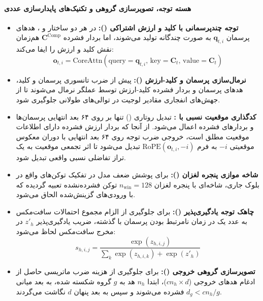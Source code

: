 \paragraph*{هسته توجه، تصویرسازی گروهی و تکنیک‌های پایدارسازی عددی}
\begin{itemize}
    \item \textbf{توجه چندپرسمانی با کلید و ارزش اشتراکی ():} در هر دو ساختار  و ، هدهای پرسمان $\mathbf{q}_{t,i}$ به صورت چندگانه تولید می‌شوند، اما بردار فشرده $\mathbf{C}^{\text{Comp}}$ هم‌زمان نقش کلید و ارزش را ایفا می‌کند:
    \begin{equation}
        \mathbf{o}_{t,i} = \text{CoreAttn}\left(\text{query}=\mathbf{q}_{t,i}, \, \text{key}=\mathbf{C}_t, \, \text{value}=\mathbf{C}_t\right)
    \end{equation}
    \item \textbf{نرمال‌سازی پرسمان و کلید-ارزش ():} پیش از ضرب تانسوری پرسمان و کلید، هدهای پرسمان و بردار فشرده کلید-ارزش توسط عملگر  نرمال می‌شوند تا از جهش‌های انفجاری مقادیر لوجیت در توالی‌های طولانی جلوگیری شود.
    \item \textbf{کدگذاری موقعیت نسبی با :} تبدیل روتاری () تنها بر روی ۶۴ بعد انتهایی پرسمان‌ها و بردارهای فشرده اعمال می‌شود. از آنجا که بردار ارزش فشرده دارای اطلاعات موقعیت مطلق است، خروجی ضرب توجه روی ۶۴ بعد انتهایی با دوران معکوس موقعیتی $-i$ به فرم $\text{RoPE}(\mathbf{o}_{t,i}, -i)$ تبدیل می‌شود تا اثر تجمعی موقعیت به یک تراز تفاضلی نسبی واقعی تبدیل شود.
    \item \textbf{شاخه موازی پنجره لغزان ():} برای پوشش ضعف مدل در تفکیک توکن‌های واقع در بلوک جاری، شاخه‌ای با پنجره لغزان $n_{\text{win}}=128$ توکن فشرده‌نشده تعبیه گردیده که با ورودی‌های گزینش‌شده الحاق می‌شود.
    \item \textbf{چاهک توجه یادگیری‌پذیر ():} برای جلوگیری از الزام مجموع احتمالات سافت‌مکس به عدد یک در زمان نامرتبط بودن پرسمان با گذشته، ضریب یادگیری‌پذیر $z'_h$ در مخرج سافت‌مکس لحاظ می‌شود:
    \begin{equation}
        s_{h,i,j} = \frac{\exp(z_{h,i,j})}{\sum_k \exp(z_{h,i,k}) + \exp(z'_h)}
    \end{equation}
    \item \textbf{تصویرسازی گروهی خروجی ():} برای جلوگیری از هزینه ضرب ماتریسی حاصل از ادغام هدهای خروجی ($cn_h \times d$)، ابتدا $n_h$ هد به $g$ گروه شکسته شده، به بعد میانی $d_g < cn_h/g$ فشرده می‌شوند و سپس به بعد پنهان $d$ نگاشت می‌گردند.
\end{itemize}

